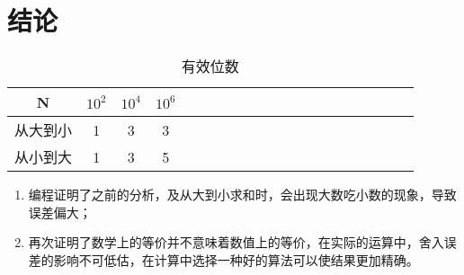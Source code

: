\section{结论}

\begin{table}[ht]
  \centering
  \caption{有效位数}
  \label{tab:1}
  \begin{tabular}{*{20}c}
     \hline
     N & $10^2$ & $10^4$ & $10^6$ \\
     \hline
     从大到小 & 1  & 3  & 3 \\
     从小到大 & 1  & 3  & 5 \\
     \hline
   \end{tabular}
\end{table}

\begin{enumerate}
    \item 编程证明了之前的分析，及从大到小求和时，会出现大数吃小数的现象，导致误差偏大；

    \item 再次证明了数学上的等价并不意味着数值上的等价，在实际的运算中，舍入误差的影响不可低估，在计算中选择一种好的算法可以使结果更加精确。
\end{enumerate}



